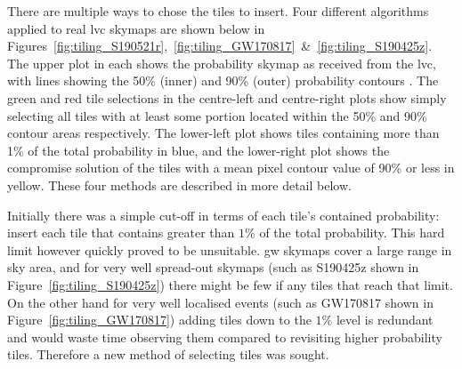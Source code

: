 \begin{colsection}
\begin{colsection}
There are multiple ways to chose the tiles to insert. Four different algorithms applied to real \gls{lvc} skymaps are shown below in Figures~\ref{fig:tiling_S190521r},~\ref{fig:tiling_GW170817}~\&~\ref{fig:tiling_S190425z}. The upper plot in each shows the probability skymap as received from the \gls{lvc}, with lines showing the 50\% (inner) and 90\% (outer) probability contours . The green and red tile selections in the centre-left and centre-right plots show simply selecting all tiles with at least some portion located within the 50\% and 90\% contour areas respectively. The lower-left plot shows tiles containing more than 1\% of the total probability in blue, and the lower-right plot shows the compromise solution of the tiles with a mean pixel contour value of 90\% or less in yellow. These four methods are described in more detail below.

Initially there was a simple cut-off in terms of each tile's contained probability: insert each tile that contains greater than $1\%$ of the total probability. This hard limit however quickly proved to be unsuitable. \gls{gw} skymaps cover a large range in sky area, and for very well spread-out skymaps (such as S190425z shown in Figure~\ref{fig:tiling_S190425z}) there might be few if any tiles that reach that limit. On the other hand for very well localised events (such as GW170817 shown in Figure~\ref{fig:tiling_GW170817}) adding tiles down to the $1\%$ level is redundant and would waste time observing them compared to revisiting higher probability tiles. Therefore a new method of selecting tiles was sought.

\clearpage



\end{colsection}
\end{colsection}
